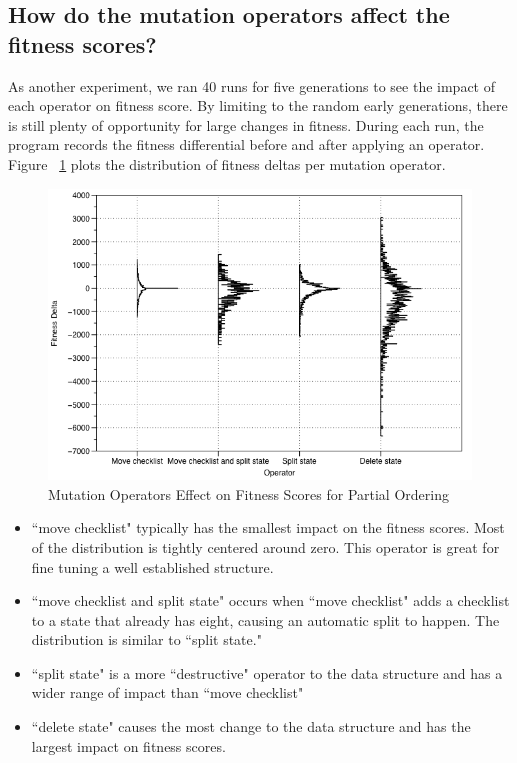 \documentclass[conference]{IEEEtran}
\begin{document}
\subsection{How do the mutation operators affect the fitness scores?}
As another experiment, we ran 40 runs for five generations to see the impact of each operator on fitness score. By limiting to the random early generations, there is still plenty of opportunity for large changes in fitness. During each run, the program records the fitness differential before and after applying an operator. Figure ~\ref{OperatorsPartialOrdering} plots the distribution of fitness deltas per mutation operator.

\begin{figure}[ht]
\includegraphics[scale=0.37]{images/operator_analysis_partial_order_first_5_gens}
\caption{Mutation Operators Effect on Fitness Scores for Partial Ordering}
\label{OperatorsPartialOrdering}
\end{figure}

\begin{itemize}
  \item ``move checklist" typically has the smallest impact on the fitness scores. Most of the distribution is tightly centered around zero. This operator is great for fine tuning a well established structure. 
  \item ``move checklist and split state" occurs when ``move checklist" adds a  checklist to a state that already has eight, causing an automatic split to happen. The distribution is similar to ``split state."
  \item ``split state" is a more ``destructive" operator to the data structure and has a wider range of impact than ``move checklist"
  \item ``delete state" causes the most change to the data structure and has the largest impact on fitness scores. 
\end{itemize}
\end{document}
